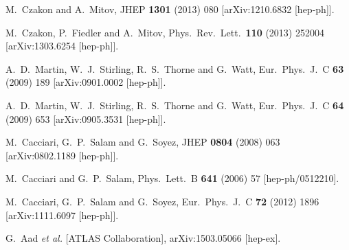 \documentclass[preprintnumbers,superscriptaddress,nofootinbib,aps,prd,floatfix]{revtex4}
\begin{document}
\begin{thebibliography}{99}
  M.~Czakon and A.~Mitov,
  JHEP {\bf 1301} (2013) 080
  [arXiv:1210.6832 [hep-ph]].
  
  M.~Czakon, P.~Fiedler and A.~Mitov,
  Phys.\ Rev.\ Lett.\  {\bf 110} (2013) 252004
  [arXiv:1303.6254 [hep-ph]].

  A.~D.~Martin, W.~J.~Stirling, R.~S.~Thorne and G.~Watt,
  Eur.\ Phys.\ J.\ C {\bf 63} (2009) 189
  [arXiv:0901.0002 [hep-ph]].

  A.~D.~Martin, W.~J.~Stirling, R.~S.~Thorne and G.~Watt,
  Eur.\ Phys.\ J.\ C {\bf 64} (2009) 653
  [arXiv:0905.3531 [hep-ph]].

  M.~Cacciari, G.~P.~Salam and G.~Soyez,
  JHEP {\bf 0804} (2008) 063
  [arXiv:0802.1189 [hep-ph]].
  
  M.~Cacciari and G.~P.~Salam,
  Phys.\ Lett.\ B {\bf 641} (2006) 57
  [hep-ph/0512210].
  
  M.~Cacciari, G.~P.~Salam and G.~Soyez,
  Eur.\ Phys.\ J.\ C {\bf 72} (2012) 1896
  [arXiv:1111.6097 [hep-ph]].
       
  G.~Aad {\it et al.} [ATLAS Collaboration],
  arXiv:1503.05066 [hep-ex].


\end{thebibliography}
\end{document}
